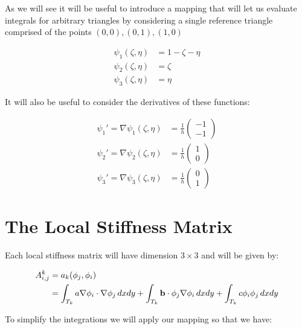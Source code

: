 As we will see it will be useful to introduce a mapping that will let us
evaluate integrals for arbitrary triangles by considering a single reference
triangle comprised of the points $(0,0), (0,1), (1,0)$


\begin{align}\label{eq:master_basis_functions}
    \psi_1(\zeta, \eta) &= 1 - \zeta - \eta \\
    \psi_2(\zeta, \eta) &= \zeta \\
    \psi_3(\zeta, \eta) &= \eta
\end{align}

It will also be useful to consider the derivatives of these functions:

\begin{align}\label{eq:master_basis_functions_derivative}
    \psi_1' = \nabla\psi_1(\zeta, \eta) &=
        \frac{1}{h}\left(\begin{array}{c}-1 \\ -1\end{array}\right) \\
    \psi_2' = \nabla\psi_2(\zeta, \eta) &=
        \frac{1}{h}\left(\begin{array}{c}1 \\ 0\end{array}\right) \\
    \psi_3' = \nabla\psi_3(\zeta, \eta) &=
        \frac{1}{h}\left(\begin{array}{c}0 \\ 1\end{array}\right)
\end{align}

\section{The Local Stiffness Matrix}

Each local stiffness matrix will have dimension $3 \times 3$ and will be given
by:

\begin{align*}
    A^k_{i,j} &= a_k(\phi_j, \phi_i) \\
     &= \int_{T_k}a\nabla\phi_i\cdot\nabla\phi_j\,dxdy +
        \int_{T_k}\mathbf{b}\cdot\phi_j\nabla\phi_i\,dxdy +
        \int_{T_k}c\phi_i\phi_j\,dxdy
\end{align*}

To simplify the integrations we will apply our mapping so that we have:

